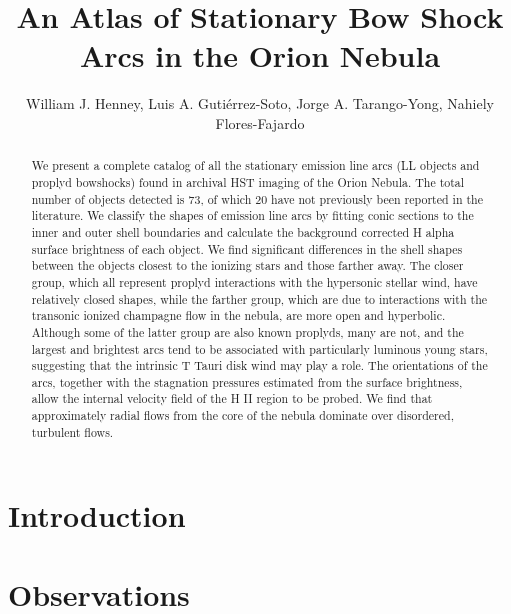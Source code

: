 \documentclass[apj, twocolumn]{aastex63}
\begin{document}
\title{
  An Atlas of Stationary Bow Shock Arcs in the Orion Nebula
}
\author{
  William J. Henney, 
  Luis A. Gutiérrez-Soto,
  Jorge A. Tarango-Yong,
  Nahiely Flores-Fajardo
}


\begin{abstract}
  We present a complete catalog of all the stationary emission line
  arcs (LL objects and proplyd bowshocks) found in archival HST imaging
  of the Orion Nebula.   The total number of objects detected is 73,
  of which 20 have not previously been reported in the literature.
  We classify the shapes of emission line arcs by fitting conic sections
  to the inner and outer shell boundaries and calculate the background
  corrected H alpha surface brightness of each object. We find significant
  differences in the shell shapes between the objects closest to the
  ionizing stars and those farther away.  The closer group, which all
  represent proplyd interactions with the hypersonic stellar wind,
  have relatively closed shapes, while the farther group, which are
  due to interactions with the transonic ionized champagne flow in
  the nebula, are more open and hyperbolic.  Although some of the
  latter group are also known proplyds, many are not, and the largest
  and brightest arcs tend to be associated with particularly luminous
  young stars, suggesting that the intrinsic T Tauri disk wind may play
  a role. The orientations of the arcs, together with the stagnation
  pressures estimated from the surface brightness, allow the internal
  velocity field of the H II region to be probed.  We find that
  approximately radial flows from the core of the nebula dominate over
  disordered, turbulent flows.
\end{abstract}

\section{Introduction}
\label{sec:intro}


\section{Observations}
\label{sec:observ}
\end{document}
